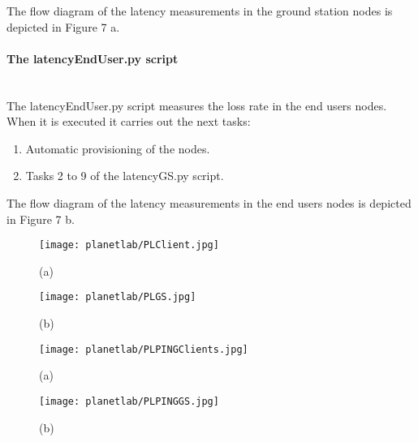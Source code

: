 The flow diagram of the latency measurements in the ground station nodes is depicted in Figure 7 a.

\paragraph{The latencyEndUser.py script}~\\

The latencyEndUser.py  script measures the loss rate in the end users
nodes. When it is executed it carries out the next tasks:
\begin{enumerate}
\item Automatic provisioning of the nodes.
\item Tasks 2 to 9 of the latencyGS.py script.
\end{enumerate}

The flow diagram of the latency measurements in the end users nodes is depicted
in Figure 7 b.

\begin{multicols}{2}
\begin{figure}[!h]
\begin{center}
\texttt{[image: planetlab/PLClient.jpg]}
\caption{(a)}
\label{fig:ple-workflow-bandwidth}
\end{center}
\end{figure}
\columnbreak
\begin{figure}[!h]
\begin{center}
\texttt{[image: planetlab/PLGS.jpg]}
\caption{(b)}
\label{fig:ple-workflow-loss-rate}
\end{center}
\end{figure}
\end{multicols}

\begin{multicols}{2}
\begin{figure}[!h]
\begin{center}
\texttt{[image: planetlab/PLPINGClients.jpg]}
\caption{(a)}
\label{fig:ple-workflow-latency-user}
\end{center}
\end{figure}
\columnbreak
\begin{figure}[!h]
\begin{center}
\texttt{[image: planetlab/PLPINGGS.jpg]}
\caption{(b)}
\label{fig:ple-workflow-latency-gs}
\end{center}
\end{figure}
\end{multicols}


